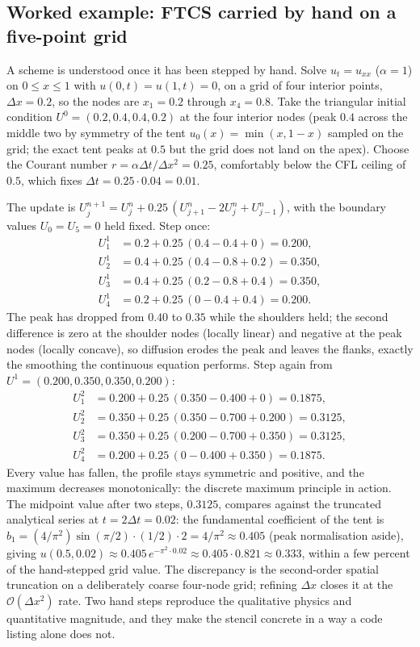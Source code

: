 \subsection{Worked example: FTCS carried by hand on a five-point grid}

A scheme is understood once it has been stepped by hand. Solve
$u_{t} = u_{xx}$ ($\alpha = 1$) on $0 \leq x \leq 1$ with
$u(0, t) = u(1, t) = 0$, on a grid of four interior points,
$\Delta x = 0.2$, so the nodes are $x_{1} = 0.2$ through $x_{4} =
0.8$. Take the triangular initial condition $U^{0} = (0.2, 0.4,
0.4, 0.2)$ at the four interior nodes (peak $0.4$ across the middle
two by symmetry of the tent $u_{0}(x) = \min(x, 1-x)$ sampled on the
grid; the exact tent peaks at $0.5$ but the grid does not land on
the apex). Choose the Courant number $r = \alpha\Delta t/\Delta
x^{2} = 0.25$, comfortably below the CFL ceiling of $0.5$, which
fixes $\Delta t = 0.25 \cdot 0.04 = 0.01$.

The update is $U_{j}^{n+1} = U_{j}^{n} + 0.25\,(U_{j+1}^{n} -
2U_{j}^{n} + U_{j-1}^{n})$, with the boundary values
$U_{0} = U_{5} = 0$ held fixed. Step once:
\begin{align*}
U_{1}^{1} &= 0.2 + 0.25\,(0.4 - 0.4 + 0) = 0.200, \\
U_{2}^{1} &= 0.4 + 0.25\,(0.4 - 0.8 + 0.2) = 0.350, \\
U_{3}^{1} &= 0.4 + 0.25\,(0.2 - 0.8 + 0.4) = 0.350, \\
U_{4}^{1} &= 0.2 + 0.25\,(0 - 0.4 + 0.4) = 0.200.
\end{align*}
The peak has dropped from $0.40$ to $0.35$ while the shoulders held;
the second difference is zero at the shoulder nodes (locally linear)
and negative at the peak nodes (locally concave), so diffusion
erodes the peak and leaves the flanks, exactly the smoothing the
continuous equation performs. Step again from
$U^{1} = (0.200, 0.350, 0.350, 0.200)$:
\begin{align*}
U_{1}^{2} &= 0.200 + 0.25\,(0.350 - 0.400 + 0) = 0.1875, \\
U_{2}^{2} &= 0.350 + 0.25\,(0.350 - 0.700 + 0.200) = 0.3125, \\
U_{3}^{2} &= 0.350 + 0.25\,(0.200 - 0.700 + 0.350) = 0.3125, \\
U_{4}^{2} &= 0.200 + 0.25\,(0 - 0.400 + 0.350) = 0.1875.
\end{align*}
Every value has fallen, the profile stays symmetric and positive,
and the maximum decreases monotonically: the discrete maximum
principle in action. The midpoint value after two steps, $0.3125$,
compares against the truncated analytical series at $t = 2\Delta t =
0.02$: the fundamental coefficient of the tent is $b_{1} =
(4/\pi^{2})\sin(\pi/2)\cdot(1/2) \cdot 2 = 4/\pi^{2} \approx
0.405$ (peak normalisation aside), giving $u(0.5, 0.02) \approx
0.405\, e^{-\pi^{2}\cdot 0.02} \approx 0.405 \cdot 0.821 \approx
0.333$, within a few percent of the hand-stepped grid value. The
discrepancy is the second-order spatial truncation on a deliberately
coarse four-node grid; refining $\Delta x$ closes it at the
$\mathcal{O}(\Delta x^{2})$ rate. Two hand steps reproduce the
qualitative physics and quantitative magnitude, and they make the
stencil concrete in a way a code listing alone does not.

